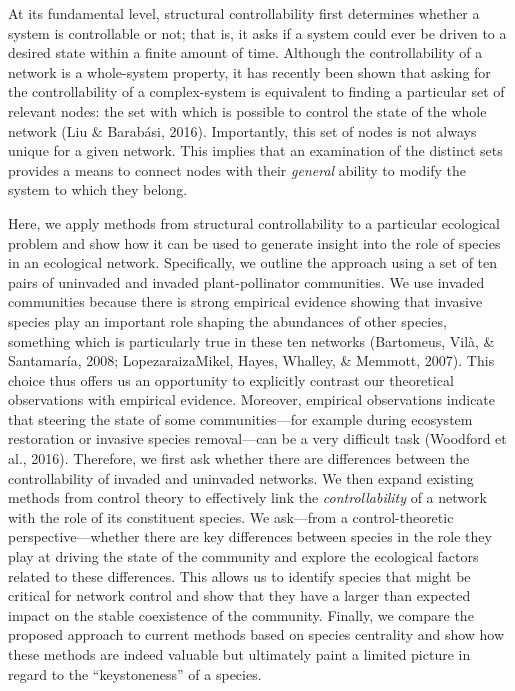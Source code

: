\documentclass[a4paper]{artikel1}
\theoremstyle{definition}
\theoremstyle{definition}
\theoremstyle{definition}
\theoremstyle{remark}
\begin{document}
At its fundamental level, structural controllability first determines
whether a system is controllable or not; that is, it asks if a system
could ever be driven to a desired state within a finite amount of time.
Although the controllability of a network is a whole-system property, it
has recently been shown that asking for the controllability of a
complex-system is equivalent to finding a particular set of relevant
nodes: the set with which is possible to control the state of the whole
network (Liu \& Barabási, 2016). Importantly, this set of nodes is not
always unique for a given network. This implies that an examination of
the distinct sets provides a means to connect nodes with their
\emph{general} ability to modify the system to which they belong.

Here, we apply methods from structural controllability to a particular
ecological problem and show how it can be used to generate insight into
the role of species in an ecological network. Specifically, we outline
the approach using a set of ten pairs of uninvaded and invaded
plant-pollinator communities. We use invaded communities because there
is strong empirical evidence showing that invasive species play an
important role shaping the abundances of other species, something which
is particularly true in these ten networks (Bartomeus, Vilà, \&
Santamaría, 2008; Lopezaraiza\textendash{}Mikel, Hayes, Whalley, \&
Memmott, 2007). This choice thus offers us an opportunity to explicitly
contrast our theoretical observations with empirical evidence. Moreover,
empirical observations indicate that steering the state of some
communities---for example during ecosystem restoration or invasive
species removal---can be a very difficult task (Woodford et al., 2016).
Therefore, we first ask whether there are differences between the
controllability of invaded and uninvaded networks. We then expand
existing methods from control theory to effectively link the
\emph{controllability} of a network with the role of its constituent
species. We ask---from a control-theoretic perspective---whether there
are key differences between species in the role they play at driving the
state of the community and explore the ecological factors related to
these differences. This allows us to identify species that might be
critical for network control and show that they have a larger than
expected impact on the stable coexistence of the community. Finally, we
compare the proposed approach to current methods based on species
centrality and show how these methods are indeed valuable but ultimately
paint a limited picture in regard to the ``keystoneness'' of a species.
\end{document}
